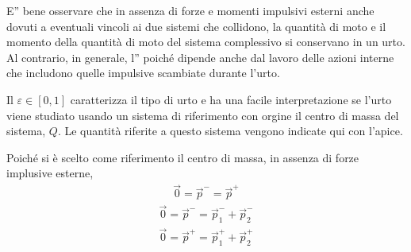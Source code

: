 \documentclass[letterpaper,10pt,italian]{jupyterBook}
\begin{document}
\sphinxAtStartPar
E” bene osservare che in assenza di forze e momenti impulsivi esterni \sphinxhyphen{} anche dovuti a eventuali vincoli \sphinxhyphen{} ai due sistemi che collidono, la quantità di moto e il momento della quantità di moto del sistema complessivo si conservano in un urto.
Al contrario, in generale, l” poiché dipende anche dal lavoro delle azioni interne che includono quelle impulsive scambiate durante l’urto.

\sphinxAtStartPar
Il  \(\varepsilon \in [0, 1]\) caratterizza il tipo di urto e ha una facile interpretazione se l’urto viene studiato usando un sistema di riferimento con orgine il centro di massa del sistema, \(Q\). Le quantità riferite a questo sistema vengono indicate qui con l’apice.

\sphinxAtStartPar
Poiché si è scelto come riferimento il centro di massa, in assenza di forze implusive esterne,
\begin{equation*}
\begin{split}\vec{0} = {\vec{p}^-}  = {\vec{p}^+} \end{split}
\end{equation*}\begin{equation*}
\begin{split}\vec{0} = {\vec{p}^-}  = {\vec{p}_1^-}  + {\vec{p}_2^-} \end{split}
\end{equation*}\begin{equation*}
\begin{split}\vec{0} = {\vec{p}^+}  = {\vec{p}_1^+}  + {\vec{p}_2^+} \end{split}
\end{equation*}
\sphinxAtStartPar
{} 
\end{document}
